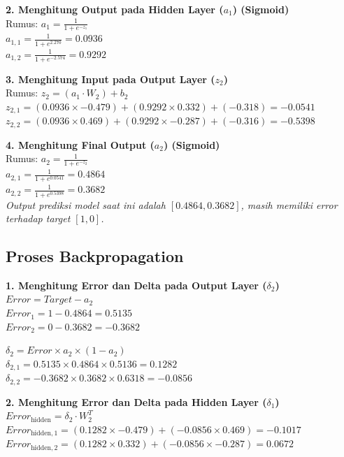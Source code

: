 \documentclass[12pt,a4paper]{article}
\begin{document}
\vspace{0.3cm}
\textbf{2. Menghitung Output pada Hidden Layer ($a_1$) (Sigmoid)} \\
Rumus: $a_1 = \frac{1}{1 + e^{-z_1}}$ \\
$a_{1,1} = \frac{1}{1 + e^{2.270}} = 0.0936$ \\
$a_{1,2} = \frac{1}{1 + e^{-2.574}} = 0.9292$

\vspace{0.3cm}
\textbf{3. Menghitung Input pada Output Layer ($z_2$)} \\
Rumus: $z_2 = (a_1 \cdot W_2) + b_2$ \\
$z_{2,1} = (0.0936 \times -0.479) + (0.9292 \times 0.332) + (-0.318) = -0.0541$ \\
$z_{2,2} = (0.0936 \times 0.469) + (0.9292 \times -0.287) + (-0.316) = -0.5398$

\vspace{0.3cm}
\textbf{4. Menghitung Final Output ($a_2$) (Sigmoid)} \\
Rumus: $a_2 = \frac{1}{1 + e^{-z_2}}$ \\
$a_{2,1} = \frac{1}{1 + e^{0.0541}} = 0.4864$ \\
$a_{2,2} = \frac{1}{1 + e^{0.5398}} = 0.3682$ \\
\textit{Output prediksi model saat ini adalah $[0.4864, 0.3682]$, masih memiliki error terhadap target $[1, 0]$.}

\newpage
\subsection{Proses Backpropagation}

\textbf{1. Menghitung Error dan Delta pada Output Layer ($\delta_2$)} \\
$Error = Target - a_2$ \\
$Error_1 = 1 - 0.4864 = 0.5135$ \\
$Error_2 = 0 - 0.3682 = -0.3682$

\vspace{0.2cm}
$\delta_2 = Error \times a_2 \times (1 - a_2)$ \\
$\delta_{2,1} = 0.5135 \times 0.4864 \times 0.5136 = 0.1282$ \\
$\delta_{2,2} = -0.3682 \times 0.3682 \times 0.6318 = -0.0856$

\vspace{0.4cm}
\textbf{2. Menghitung Error dan Delta pada Hidden Layer ($\delta_1$)} \\
$Error_{\text{hidden}} = \delta_2 \cdot W_2^T$ \\
$Error_{\text{hidden},1} = (0.1282 \times -0.479) + (-0.0856 \times 0.469) = -0.1017$ \\
$Error_{\text{hidden},2} = (0.1282 \times 0.332) + (-0.0856 \times -0.287) = 0.0672$
\end{document}
